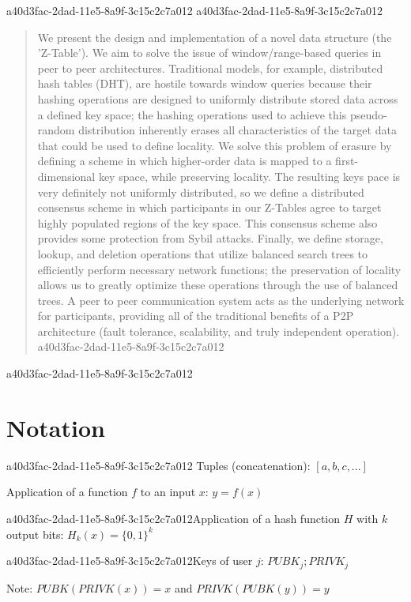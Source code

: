 \documentclass[12pt]{article}
\begin{document}
\maketitle
a40d3fac-2dad-11e5-8a9f-3c15c2c7a012
a40d3fac-2dad-11e5-8a9f-3c15c2c7a012\begin{abstract}
We present the design and implementation of a novel data structure (the 'Z-Table'). We aim to solve the issue of window/range-based queries in peer to peer architectures. Traditional models, for example,  distributed hash tables (DHT), are hostile towards window queries because their hashing operations are designed to uniformly distribute stored data across a defined key space; the hashing operations used to achieve this pseudo-random distribution inherently erases all characteristics of the target data that could be used to define locality. We solve this problem of erasure by defining a scheme in which higher-order data is mapped to a first-dimensional key space, while preserving locality. The resulting keys pace is very definitely not uniformly distributed, so we define a distributed consensus scheme in which participants in our Z-Tables agree to target highly populated regions of the key space. This consensus scheme also provides some protection from Sybil attacks. Finally, we define storage, lookup, and deletion operations that utilize balanced search trees to efficiently perform necessary network functions; the preservation of locality allows us to greatly optimize these operations through the use of balanced trees. A peer to peer communication system acts as the underlying network for participants, providing all of the traditional benefits of a P2P architecture (fault tolerance, scalability, and truly independent operation).
a40d3fac-2dad-11e5-8a9f-3c15c2c7a012\end{abstract}
a40d3fac-2dad-11e5-8a9f-3c15c2c7a012
\section{Notation}
a40d3fac-2dad-11e5-8a9f-3c15c2c7a012
Tuples (concatenation): $[a,b,c,...]$

Application of a function $f$ to an input $x$: $y=f(x)$

a40d3fac-2dad-11e5-8a9f-3c15c2c7a012Application of a hash function $H$ with $k$ output bits: $H_{k}(x) = \{0,1\}^k$

a40d3fac-2dad-11e5-8a9f-3c15c2c7a012Keys of user $j$: $ PUBK_j; PRIVK_j $

Note: $PUBK(PRIVK(x)) = x$ and $PRIVK(PUBK(y)) = y$~
\end{document}
